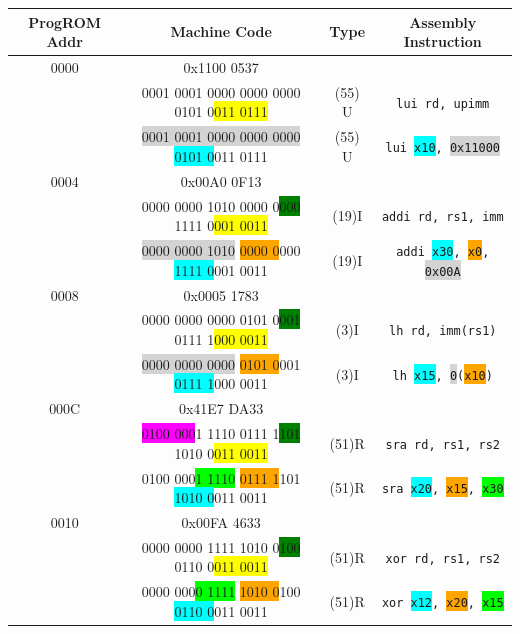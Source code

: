 \documentclass[a4paper]{report}
\begin{document}
				\begin{table}[H]
					\centering
					\begin{tabular}{||c|c|c|c||}
						\hline
						\textbf{ProgROM Addr} & \textbf{Machine Code} & \textbf{Type} & \textbf{Assembly Instruction} \\\hline
						0000 & \tiny{0x1100 0537} & & \\ \hline
							 & \tiny{0001 0001 0000 0000 0000 0101 0\colorbox{yellow}{011 0111}} & (55) U  & \texttt{lui rd, upimm}\\ \hline
							 & \tiny{\colorbox{lightgray}{0001 0001 0000 0000 0000} \colorbox{cyan}{0101 0}011 0111} & (55) U  & \texttt{lui \colorbox{cyan}{x10}, \colorbox{lightgray}{0x11000}}\\ \hline

						0004 & \tiny{0x00A0 0F13} & & \\ \hline
							 & \tiny{0000 0000 1010 0000 0\colorbox{green}{000} 1111 0\colorbox{yellow}{001 0011}} & (19)I & \texttt{addi rd, rs1, imm}\\ \hline
							 & \tiny{\colorbox{lightgray}{0000 0000 1010} \colorbox{orange}{0000 0}000 \colorbox{cyan}{1111 0}001 0011} & (19)I & \texttt{addi \colorbox{cyan}{x30}, \colorbox{orange}{x0}, \colorbox{lightgray}{0x00A}}\\ \hline

						0008 & \tiny{0x0005 1783} & & \\ \hline
							 & \tiny{0000 0000 0000 0101 0\colorbox{green}{001} 0111 1\colorbox{yellow}{000 0011}} & (3)I & \texttt{lh rd, imm(rs1)}\\ \hline
							 & \tiny{\colorbox{lightgray}{0000 0000 0000} \colorbox{orange}{0101 0}001 \colorbox{cyan}{0111 1}000 0011} & (3)I & \texttt{lh \colorbox{cyan}{x15}, \colorbox{lightgray}{0}(\colorbox{orange}{x10})}\\ \hline

						000C & \tiny{0x41E7 DA33} & & \\ \hline
							 & \tiny{\colorbox{magenta}{0100 000}1 1110 0111 1\colorbox{green}{101} 1010 0\colorbox{yellow}{011 0011}} & (51)R & \texttt{sra rd, rs1, rs2}\\ \hline
							 & \tiny{0100 000\colorbox{lime}{1 1110} \colorbox{orange}{0111 1}101 \colorbox{cyan}{1010 0}011 0011} & (51)R & \texttt{sra \colorbox{cyan}{x20}, \colorbox{orange}{x15}, \colorbox{lime}{x30}}\\ \hline

						0010 & \tiny{0x00FA 4633} & & \\ \hline
							 & \tiny{0000 0000 1111 1010 0\colorbox{green}{100} 0110 0\colorbox{yellow}{011 0011}} & (51)R & \texttt{xor rd, rs1, rs2}\\ \hline
							 & \tiny{0000 000\colorbox{lime}{0 1111} \colorbox{orange}{1010 0}100 \colorbox{cyan}{0110 0}011 0011} &(51)R & \texttt{xor \colorbox{cyan}{x12}, \colorbox{orange}{x20}, \colorbox{lime}{x15}}\\ \hline


\end{tabular}
\end{table}
\end{document}
